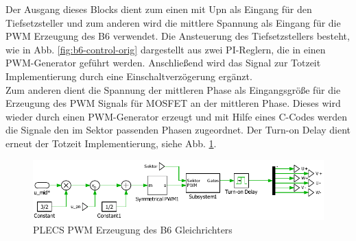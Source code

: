 			Der Ausgang dieses Blocks dient zum einen mit \gls{Upn} als Eingang für den Tiefsetzsteller und zum anderen wird die mittlere Spannung als Eingang für die PWM Erzeugung des B6 verwendet. Die Ansteuerung des Tiefsetzstellers besteht, wie in Abb. \ref{fig:b6-control-orig} dargestellt aus zwei PI-Reglern, die in einen PWM-Generator geführt werden. Anschließend wird das Signal zur Totzeit Implementierung durch eine Einschaltverzögerung ergänzt.\\
			Zum anderen dient die Spannung der mittleren Phase  als Eingangsgröße für die Erzeugung des PWM Signals für \gls{MOSFET} an der mittleren Phase. Dieses wird wieder durch einen PWM-Generator erzeugt und mit Hilfe eines C-Codes werden die Signale den im Sektor passenden Phasen zugeordnet. Der Turn-on Delay dient erneut der Totzeit Implementierung, siehe Abb. \ref{fig:plecsb6controlpwmmid}.
			
		\begin{figure}
			\centering
			\includegraphics[width=0.9\linewidth]{content/Grafiken/PLECS_B6_ControlPWMmid}
			\caption{PLECS PWM Erzeugung des B6 Gleichrichters}
			\label{fig:plecsb6controlpwmmid}
		\end{figure}
		
		
			
			
